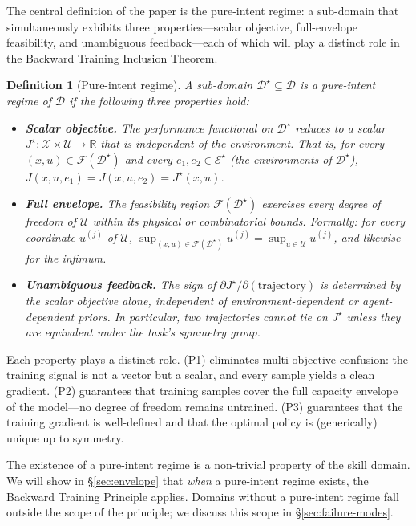 \documentclass[twocolumn,11pt,a4paper]{article}
\newtheorem{definition}[theorem]{Definition}
\newcommand{\cD}{\mathcal{D}}
\newcommand{\cF}{\mathcal{F}}
\newcommand{\cU}{\mathcal{U}}
\newcommand{\cX}{\mathcal{X}}
\newcommand{\cE}{\mathcal{E}}
\newcommand{\R}{\mathbb{R}}
\begin{document}
The central definition of the paper is the pure-intent regime: a sub-domain that simultaneously exhibits three properties---scalar objective, full-envelope feasibility, and unambiguous feedback---each of which will play a distinct role in the Backward Training Inclusion Theorem.

\begin{definition}[Pure-intent regime]
\label{def:pure-intent}
A sub-domain $\cD^\star \subseteq \cD$ is a \emph{pure-intent regime} of $\cD$ if the following three properties hold:
\begin{itemize}[leftmargin=*,itemsep=2pt]
\item[(P1)] \textbf{Scalar objective.} The performance functional on $\cD^\star$ reduces to a scalar $J^\star: \cX \times \cU \to \R$ that is independent of the environment. That is, for every $(x, u) \in \cF(\cD^\star)$ and every $e_1, e_2 \in \cE^\star$ (the environments of $\cD^\star$), $J(x, u, e_1) = J(x, u, e_2) = J^\star(x, u)$.
\item[(P2)] \textbf{Full envelope.} The feasibility region $\cF(\cD^\star)$ exercises every degree of freedom of $\cU$ within its physical or combinatorial bounds. Formally: for every coordinate $u^{(j)}$ of $\cU$, $\sup_{(x,u) \in \cF(\cD^\star)} u^{(j)} = \sup_{u \in \cU} u^{(j)}$, and likewise for the infimum.
\item[(P3)] \textbf{Unambiguous feedback.} The sign of $\partial J^\star / \partial(\text{trajectory})$ is determined by the scalar objective alone, independent of environment-dependent or agent-dependent priors. In particular, two trajectories cannot tie on $J^\star$ unless they are equivalent under the task's symmetry group.
\end{itemize}
\end{definition}

Each property plays a distinct role. (P1) eliminates multi-objective confusion: the training signal is not a vector but a scalar, and every sample yields a clean gradient. (P2) guarantees that training samples cover the full capacity envelope of the model---no degree of freedom remains untrained. (P3) guarantees that the training gradient is well-defined and that the optimal policy is (generically) unique up to symmetry.

The existence of a pure-intent regime is a non-trivial property of the skill domain. We will show in \S\ref{sec:envelope} that \emph{when} a pure-intent regime exists, the Backward Training Principle applies. Domains without a pure-intent regime fall outside the scope of the principle; we discuss this scope in \S\ref{sec:failure-modes}.
\end{document}
